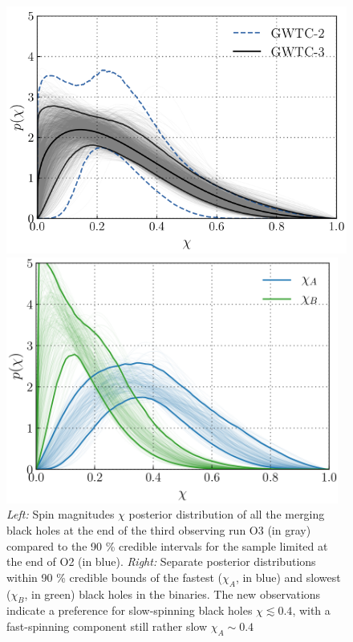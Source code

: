 \documentclass[a4paper,titlepage]{book}     	%
\begin{document}
\begin{figure}
	\begin{minipage}{.49\textwidth}
		\centering
		\includegraphics[width=\textwidth]{./images/spinmagnitude.png}
	\end{minipage}
	\hfill
	\begin{minipage}{.49\textwidth}
		\vspace{0.8mm}
		\centering
		\includegraphics[width=0.975\textwidth]{./images/spinmagnitudehighlow.png}	
	\end{minipage}
	\caption{\emph{Left:} Spin magnitudes $\chi$ posterior distribution of all the merging black holes at the end of the third observing run O3 (in gray) compared to the 90 \% credible intervals for the sample limited at the end of O2 (in blue). \emph{Right:} Separate posterior distributions within 90 \% credible bounds of the fastest ($\chi_A$, in blue) and slowest ($\chi_B$, in green) black holes in the binaries. The new observations indicate a preference for slow-spinning black holes $\chi \lesssim 0.4$, with a fast-spinning component still rather slow $\chi_A \sim 0.4$ \cite{GWTC-3_interpretation}} \label{fig:spinmagnitude}
\end{figure}
\end{document}
